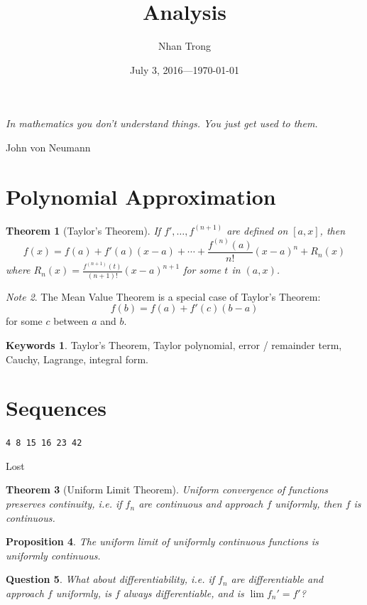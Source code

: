\documentclass[12pt]{article}
\title{Analysis}
\author{Nhan Trong}
\date{July 3, 2016---\today}                                           %
\theoremstyle{plain}
\newtheorem{theorem}{Theorem}
\newtheorem{proposition}[theorem]{Proposition}
\newtheorem{question}[theorem]{Question}
\theoremstyle{definition}
\newtheorem{keywords}{Keywords}
\theoremstyle{remark}
\newtheorem{note}[theorem]{Note}
\begin{document}
\sloppy
\maketitle

\epigraph{\textit{In mathematics you don't understand things. You just get used to them.}}{John von Neumann}

\part{Polynomial Approximation}

\begin{theorem}[Taylor's Theorem]
If $f', \ldots, f^{(n+1)}$ are defined on $[a, x]$, then 
$$f(x) = f(a) + f'(a)(x - a) + \cdots + \frac{f^{(n)}(a)}{n!}(x - a)^n + R_n(x)$$
where $R_n(x) = \frac{f^{(n+1)}(t)}{(n+1)!}(x - a)^{n+1}$ for some $t$ in $(a, x)$.
\end{theorem}

\begin{note}
The Mean Value Theorem is a special case of Taylor's Theorem:
$$f(b) = f(a) + f'(c)(b - a)$$
for some $c$ between $a$ and $b$.
\end{note}

\begin{keywords}
Taylor's Theorem, Taylor polynomial, error / remainder term, Cauchy, Lagrange, integral form.
\end{keywords}

\part{Sequences}

\epigraph{\texttt{4 8 15 16 23 42}}{Lost}

\begin{theorem}[Uniform Limit Theorem]
Uniform convergence of functions preserves continuity, i.e. if $f_n$ are continuous and approach $f$ uniformly, then $f$ is continuous.
\end{theorem}

\begin{proposition}
The uniform limit of uniformly continuous functions is uniformly continuous.
\end{proposition}

\begin{question}
What about differentiability, i.e. if $f_n$ are differentiable and approach $f$ uniformly, is $f$ always differentiable, and is $\lim f_n' = f'$? 
\end{question}
\end{document}
